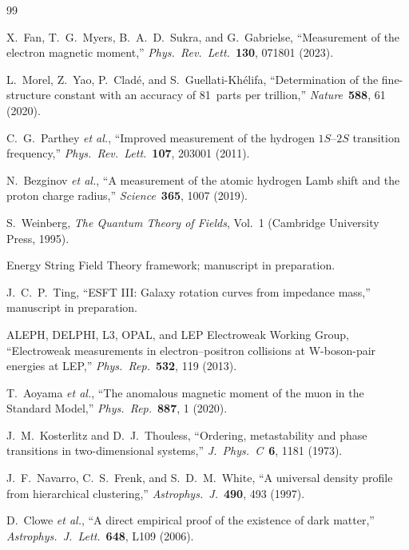 ﻿\documentclass[a4paper,12pt]{article}
\begin{document}
\begin{thebibliography}{99}

  X.~Fan, T.~G.~Myers, B.~A.~D.~Sukra, and G.~Gabrielse,
  ``Measurement of the electron magnetic moment,''
  \emph{Phys.\ Rev.\ Lett.}\ \textbf{130}, 071801 (2023).

  L.~Morel, Z.~Yao, P.~Clad\'e, and S.~Guellati-Kh\'elifa,
  ``Determination of the fine-structure constant with an accuracy of
  81~parts per trillion,''
  \emph{Nature}\ \textbf{588}, 61 (2020).

  C.~G.~Parthey \emph{et al.},
  ``Improved measurement of the hydrogen $1S$--$2S$ transition
  frequency,''
  \emph{Phys.\ Rev.\ Lett.}\ \textbf{107}, 203001 (2011).

  N.~Bezginov \emph{et al.},
  ``A measurement of the atomic hydrogen Lamb shift and the proton
  charge radius,''
  \emph{Science}\ \textbf{365}, 1007 (2019).

  S.~Weinberg,
  \emph{The Quantum Theory of Fields}, Vol.~1
  (Cambridge University Press, 1995).

  Energy String Field Theory framework;
  manuscript in preparation.

  J.~C.~P.~Ting,
  ``ESFT III: Galaxy rotation curves from impedance mass,''
  manuscript in preparation.

  ALEPH, DELPHI, L3, OPAL, and LEP Electroweak Working Group,
  ``Electroweak measurements in electron--positron collisions at
  W-boson-pair energies at LEP,''
  \emph{Phys.\ Rep.}\ \textbf{532}, 119 (2013).

  T.~Aoyama \emph{et al.},
  ``The anomalous magnetic moment of the muon in the Standard Model,''
  \emph{Phys.\ Rep.}\ \textbf{887}, 1 (2020).

  J.~M.~Kosterlitz and D.~J.~Thouless,
  ``Ordering, metastability and phase transitions in two-dimensional
  systems,''
  \emph{J.\ Phys.\ C}\ \textbf{6}, 1181 (1973).

  J.~F.~Navarro, C.~S.~Frenk, and S.~D.~M.~White,
  ``A universal density profile from hierarchical clustering,''
  \emph{Astrophys.\ J.}\ \textbf{490}, 493 (1997).

  D.~Clowe \emph{et al.},
  ``A direct empirical proof of the existence of dark matter,''
  \emph{Astrophys.\ J.\ Lett.}\ \textbf{648}, L109 (2006).


\end{thebibliography}
\end{document}
